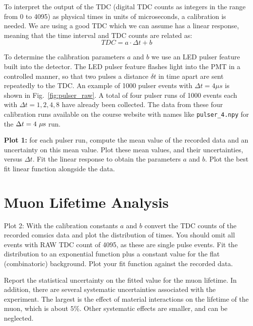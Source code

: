 To interpret the output of the TDC (digital TDC counts as integers in
the range from 0 to 4095) as physical times in units of microseconds,
a calibration is needed.  We are using a good TDC which we can assume has a linear response, meaning that the time interval and TDC counts are related as:
\begin{displaymath}
TDC = a \cdot \Delta t  + b 
\end{displaymath}

To determine the calibration parameters $a$ and $b$ we use an LED
pulser feature built into the detector.  The LED pulser feature
flashes light into the PMT in a controlled manner, so that two pulses
a distance $\delta t$ in time apart are sent repeatedly to the TDC.
An example of 1000 pulser events with $\Delta t = 4 \mu s$ is shown in
Fig.~\ref{fig:pulser_raw}.  A total of four pulser runs of 1000 events
each with $\Delta t = 1,2,4,8$ have already been collected.  The data
from these four calibration runs available on the course website with
names like {\tt pulser{\_}4.npy} for the $\Delta t = 4~\rm \mu s$ run.

{\bf Plot 1:}  for each pulser run, compute the mean value of the recorded data and an uncertainty on this mean value.
Plot these mean values, and their uncertainties, versus $\Delta t$.  Fit the linear response to obtain the parameters $a$ and $b$.  Plot the best fit linear function alongside the data.

\section{Muon Lifetime Analysis}

{\rm Plot 2: } With the calibration constants $a$ and $b$ convert the
TDC counts of the recorded comsics data and plot the distribution of
times.  You should omit all events with RAW TDC count of 4095, as
these are single pulse events.  Fit the distribution to an exponential
function plus a constant value for the flat (combinatoric) background.
Plot your fit function against the recorded data.

Report the statistical uncertainty on the fitted value for
the muon lifetime.  In addition, there are several systematic
uncertainties associated with the experiment.  The largest is the
effect of material interactions on the lifetime of the muon, which is
about $5\%$.  Other systematic effects are smaller, and can be
neglected.



